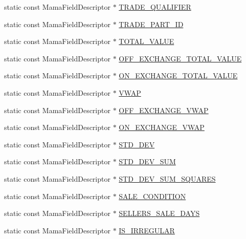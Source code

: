 \begin{CompactItemize}
\item 
static const Mama\-Field\-Descriptor $\ast$ \hyperlink{classWombat_1_1MamdaTradeFields_7f69f889fa4ca604862502356af026b4}{TRADE\_\-QUALIFIER}
\item 
static const Mama\-Field\-Descriptor $\ast$ \hyperlink{classWombat_1_1MamdaTradeFields_497d497834276275d80598ee473bf7fb}{TRADE\_\-PART\_\-ID}
\item 
static const Mama\-Field\-Descriptor $\ast$ \hyperlink{classWombat_1_1MamdaTradeFields_6920201b1fa1f1038d4197f691c197a8}{TOTAL\_\-VALUE}
\item 
static const Mama\-Field\-Descriptor $\ast$ \hyperlink{classWombat_1_1MamdaTradeFields_717ae134d77d96f906ab623f331b5d9b}{OFF\_\-EXCHANGE\_\-TOTAL\_\-VALUE}
\item 
static const Mama\-Field\-Descriptor $\ast$ \hyperlink{classWombat_1_1MamdaTradeFields_60c81d33667f4368dbc465b043d69837}{ON\_\-EXCHANGE\_\-TOTAL\_\-VALUE}
\item 
static const Mama\-Field\-Descriptor $\ast$ \hyperlink{classWombat_1_1MamdaTradeFields_42571181bda9b1960596eb43f4bed4bd}{VWAP}
\item 
static const Mama\-Field\-Descriptor $\ast$ \hyperlink{classWombat_1_1MamdaTradeFields_3cadc3e8e4dee2bcb33e94d5ccd61950}{OFF\_\-EXCHANGE\_\-VWAP}
\item 
static const Mama\-Field\-Descriptor $\ast$ \hyperlink{classWombat_1_1MamdaTradeFields_6a61bbc368a916396aaace1adfaf449b}{ON\_\-EXCHANGE\_\-VWAP}
\item 
static const Mama\-Field\-Descriptor $\ast$ \hyperlink{classWombat_1_1MamdaTradeFields_f70a54c4b4e898fb67174065584deeb3}{STD\_\-DEV}
\item 
static const Mama\-Field\-Descriptor $\ast$ \hyperlink{classWombat_1_1MamdaTradeFields_ae928651068cc99b18cf81dcd9316c5e}{STD\_\-DEV\_\-SUM}
\item 
static const Mama\-Field\-Descriptor $\ast$ \hyperlink{classWombat_1_1MamdaTradeFields_c893dd72ef0c314bbac5343dd27a96bb}{STD\_\-DEV\_\-SUM\_\-SQUARES}
\item 
static const Mama\-Field\-Descriptor $\ast$ \hyperlink{classWombat_1_1MamdaTradeFields_a42d2901c067527a5a9f81abaf5c4715}{SALE\_\-CONDITION}
\item 
static const Mama\-Field\-Descriptor $\ast$ \hyperlink{classWombat_1_1MamdaTradeFields_f3474948411eaaa9298ac0d0615bb3fa}{SELLERS\_\-SALE\_\-DAYS}
\item 
static const Mama\-Field\-Descriptor $\ast$ \hyperlink{classWombat_1_1MamdaTradeFields_a8fb24ec4c53a138b57e8c7f23ca4dd7}{IS\_\-IRREGULAR}

\end{CompactItemize}
